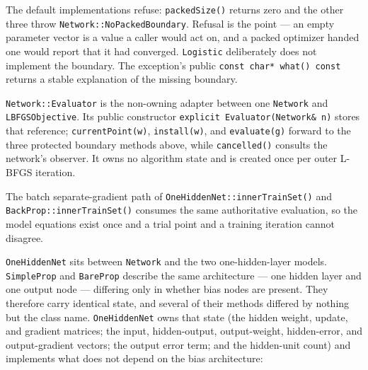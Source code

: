 The default implementations refuse: \texttt{packedSize()} returns zero and the
other three throw \texttt{Network::NoPackedBoundary}.  Refusal is the point --- an
empty parameter vector is a value a caller would act on, and a packed optimizer
handed one would report that it had converged.  \texttt{Logistic} deliberately
does not implement the boundary. The exception's public
\texttt{const char* what() const} returns a stable explanation of the missing
boundary.

\texttt{Network::Evaluator} is the non-owning adapter between one
\texttt{Network} and \texttt{LBFGSObjective}. Its public constructor
\texttt{explicit Evaluator(Network\& n)} stores that reference;
\texttt{currentPoint(w)}, \texttt{install(w)}, and \texttt{evaluate(g)} forward
to the three protected boundary methods above, while \texttt{cancelled()}
consults the network's observer. It owns no algorithm state and is created once
per outer L-BFGS iteration.

The batch separate-gradient path of \texttt{OneHiddenNet::innerTrainSet()} and
\texttt{BackProp::innerTrainSet()} consumes the same authoritative evaluation,
so the model equations exist once and a trial point and a training iteration
cannot disagree.

\texttt{OneHiddenNet} sits between \texttt{Network} and the two
one-hidden-layer models.
\texttt{SimpleProp} and \texttt{BareProp} describe the same architecture ---
one hidden layer and one output node --- differing only in whether bias nodes
are present.  They therefore carry identical state, and several of their
methods differed by nothing but the class name.  \texttt{OneHiddenNet} owns
that state (the hidden weight, update, and gradient matrices; the input,
hidden-output, output-weight, hidden-error, and output-gradient vectors; the
output error term; and the hidden-unit count) and implements what does not
depend on the bias architecture:


